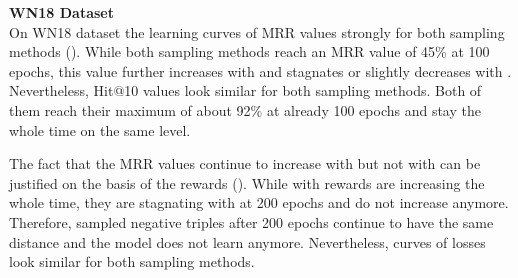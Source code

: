 \textbf{WN18 Dataset}
\label{subsubsec:uncertainty_wn18}\\
%
On \textsc{WN18} dataset the learning curves of MRR values strongly for both sampling methods ().
While both sampling methods reach an MRR value of 45\% at 100 epochs, this value further increases with \origsampling and stagnates or slightly decreases with \ussoftmax.
Nevertheless, Hit@10 values look similar for both sampling methods.
Both of them reach their maximum of about 92\% at already 100 epochs and stay the whole time on the same level.

The fact that the MRR values continue to increase with \origsampling but not with \ussoftmax can be justified on the basis of the rewards ().
While with \origsampling rewards are increasing the whole time, they are stagnating with \ussoftmax at 200 epochs and do not increase anymore.
Therefore, sampled negative triples after 200 epochs continue to have the same distance and the model does not learn anymore.
Nevertheless, curves of losses look similar for both sampling methods.
\clearpage
